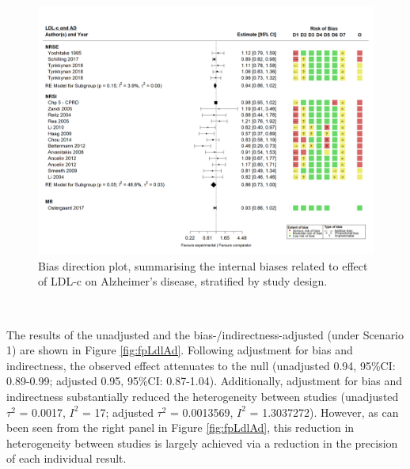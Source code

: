 \documentclass[a4paper, twoside]{templates/ociamthesis}
\begin{document}
~





\begin{figure}[H]
\includegraphics[width=1\linewidth]{figures/tri/midlife_AD} \caption[Bias direction plot, summarising internal biases]{Bias direction plot, summarising the internal biases related to effect of LDL-c on Alzheimer's disease, stratified by study design.}\label{fig:ldlAdBiasDirection}
\end{figure}

~

The results of the unadjusted and the bias-/indirectness-adjusted (under Scenario 1) are shown in Figure \ref{fig:fpLdlAd}. Following adjustment for bias and indirectness, the observed effect attenuates to the null (unadjusted 0.94, 95\%CI: 0.89-0.99; adjusted 0.95, 95\%CI: 0.87-1.04). Additionally, adjustment for bias and indirectness substantially reduced the heterogeneity between studies (unadjusted \(\tau^2\) = 0.0017, \(I^2\) = 17; adjusted \(\tau^2\) = 0.0013569, \(I^2\) = 1.3037272). However, as can been seen from the right panel in Figure \ref{fig:fpLdlAd}, this reduction in heterogeneity between studies is largely achieved via a reduction in the precision of each individual result.

~
\end{document}
